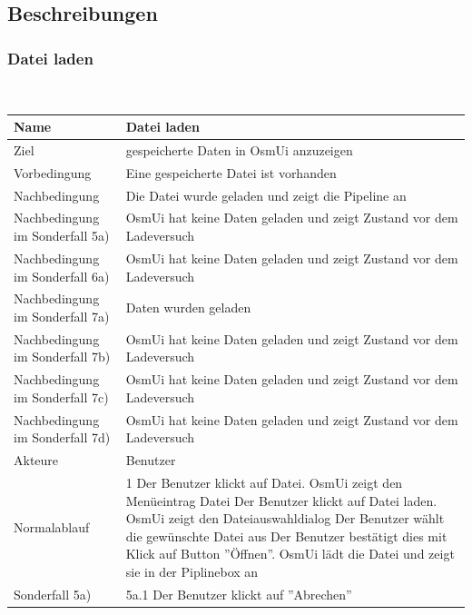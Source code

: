 \documentclass[a4paper,12pt]{scrartcl}
\begin{document}
\subsection{Beschreibungen}
\subsubsection{Datei laden}
\begin{center}
\ \\
\begin{tabular}{|p{5cm}|p{10cm}|}
\hline Name & \textbf{Datei laden} \\ 
\hline Ziel & gespeicherte Daten in OsmUi anzuzeigen \\ 
\hline Vorbedingung & Eine gespeicherte Datei ist vorhanden \\
\hline Nachbedingung & Die Datei wurde geladen und zeigt die Pipeline an\\ 
\hline Nachbedingung im Sonderfall 5a) & OsmUi hat keine Daten geladen und zeigt Zustand vor dem Ladeversuch \\ 
\hline Nachbedingung im Sonderfall 6a) & OsmUi hat keine Daten geladen und zeigt Zustand vor dem Ladeversuch \\ 
\hline Nachbedingung im Sonderfall 7a) & Daten wurden geladen\\
\hline Nachbedingung im Sonderfall 7b) & OsmUi hat keine Daten geladen und zeigt Zustand vor dem Ladeversuch \\
\hline Nachbedingung im Sonderfall 7c) & OsmUi hat keine Daten geladen und zeigt Zustand vor dem Ladeversuch \\
\hline Nachbedingung im Sonderfall 7d) & OsmUi hat keine Daten geladen und zeigt Zustand vor dem Ladeversuch \\
\hline Akteure & Benutzer \\ 
\hline Normalablauf & 1 Der Benutzer klickt auf Datei.
\newline 2 OsmUi zeigt den Menüeintrag Datei
\newline 3 Der Benutzer klickt auf Datei laden.
\newline 4 OsmUi zeigt den Dateiauswahldialog
\newline 5 Der Benutzer wählt die gewünschte Datei aus
\newline 6 Der Benutzer bestätigt dies mit Klick auf Button ''Öffnen''.
\newline 7 OsmUi lädt die Datei und zeigt sie in der Piplinebox an\\ 
\hline Sonderfall 5a) & 5a.1 Der Benutzer klickt auf ''Abrechen''

\end{tabular}
\end{center}
\end{document}
